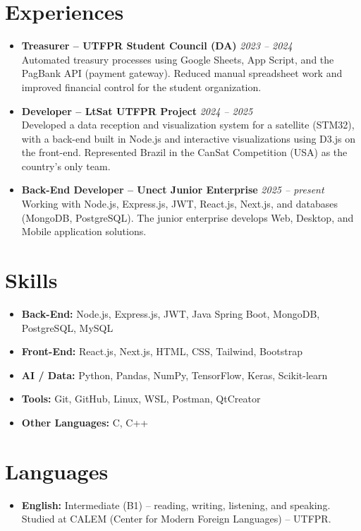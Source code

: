 \documentclass[a4paper,10pt]{article}
\begin{document}
\section*{Experiences}
\begin{itemize}[leftmargin=*]
    \item \textbf{Treasurer – UTFPR Student Council (DA)} \hfill \textit{2023 – 2024} \\
    Automated treasury processes using Google Sheets, App Script, and the PagBank API (payment gateway). Reduced manual spreadsheet work and improved financial control for the student organization.

    \item \textbf{Developer – LtSat UTFPR Project} \hfill \textit{2024 – 2025} \\
    Developed a data reception and visualization system for a satellite (STM32), with a back-end built in Node.js and interactive visualizations using D3.js on the front-end. Represented Brazil in the CanSat Competition (USA) as the country's only team.

    \item \textbf{Back-End Developer – Unect Junior Enterprise} \hfill \textit{2025 – present} \\
    Working with Node.js, Express.js, JWT, React.js, Next.js, and databases (MongoDB, PostgreSQL). The junior enterprise develops Web, Desktop, and Mobile application solutions.
\end{itemize}

\section*{Skills}
\begin{itemize}[leftmargin=*]
    \item \textbf{Back-End:} Node.js, Express.js, JWT, Java Spring Boot, MongoDB, PostgreSQL, MySQL
    \item \textbf{Front-End:} React.js, Next.js, HTML, CSS, Tailwind, Bootstrap
    \item \textbf{AI / Data:} Python, Pandas, NumPy, TensorFlow, Keras, Scikit-learn
    \item \textbf{Tools:} Git, GitHub, Linux, WSL, Postman, QtCreator
    \item \textbf{Other Languages:} C, C++
\end{itemize}

\section*{Languages}
\begin{itemize}[leftmargin=*]
    \item \textbf{English:} Intermediate (B1) – reading, writing, listening, and speaking. Studied at CALEM (Center for Modern Foreign Languages) – UTFPR.
\end{itemize}
\end{document}
